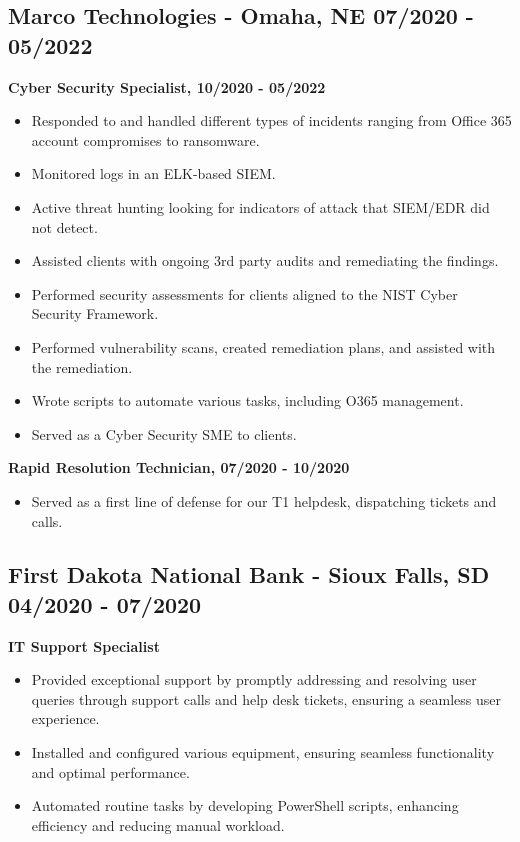 \documentclass[a4paper,10pt]{article}
\begin{document}
\subsection*{Marco Technologies - Omaha, NE \hfill 07/2020 - 05/2022}
\textbf{Cyber Security Specialist, 10/2020 - 05/2022}
\begin{itemize}
    \leftskip=4em
    \item Responded to and handled different types of incidents ranging from Office 365 account compromises to ransomware.
    \item Monitored logs in an ELK-based SIEM.
    \item Active threat hunting looking for indicators of attack that SIEM/EDR did not detect.
    \item Assisted clients with ongoing 3rd party audits and remediating the findings.
    \item Performed security assessments for clients aligned to the NIST Cyber Security Framework.
    \item Performed vulnerability scans, created remediation plans, and assisted with the remediation.
    \item Wrote scripts to automate various tasks, including O365 management.
    \item Served as a Cyber Security SME to clients.
\end{itemize}
\textbf{Rapid Resolution Technician, 07/2020 - 10/2020}
\begin{itemize}
    \leftskip=4em
    \item Served as a first line of defense for our T1 helpdesk, dispatching tickets and calls.
\end{itemize}

\subsection*{First Dakota National Bank - Sioux Falls, SD \hfill 04/2020 - 07/2020}
\textbf{IT Support Specialist}
\begin{itemize}
    \leftskip=4em
	\item Provided exceptional support by promptly addressing and resolving user queries through support calls and help desk tickets, ensuring a seamless user experience.
    \item Installed and configured various equipment, ensuring seamless functionality and optimal performance.
    \item Automated routine tasks by developing PowerShell scripts, enhancing efficiency and reducing manual workload.
\end{itemize}
\end{document}
